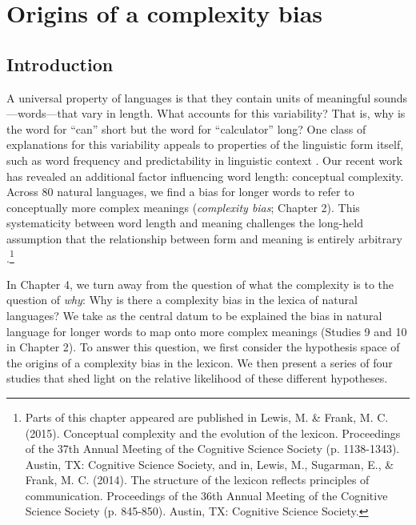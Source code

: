 
\chapter{Origins of a complexity bias}
\label{chapter:origins}

\section{Introduction}

A universal property of languages is that they contain units of meaningful sounds---words---that vary in length. What accounts for this variability? That is, why is the word for ``can'' short but the word for ``calculator'' long? One class of explanations for this variability appeals to properties of the linguistic form itself, such as word frequency \cite{zipf1936} and predictability in linguistic context \cite{piantadosi2011a,mahowald2013info}. Our recent work has revealed an additional factor influencing word length: conceptual complexity. Across 80 natural languages, we find a bias for longer words to refer to conceptually more complex meanings ({\it complexity bias}; Chapter 2). This systematicity between word length and meaning challenges the long-held assumption that the relationship between form and meaning is entirely arbitrary \cite{saussure}.\footnote{Parts of this chapter appeared are published in  Lewis, M. \& Frank, M. C. (2015). Conceptual complexity and the evolution of the lexicon. Proceedings of the 37th Annual Meeting of the Cognitive Science Society (p. 1138-1343). Austin, TX: Cognitive Science Society, and in,  Lewis, M., Sugarman, E., \& Frank, M. C. (2014). The structure of the lexicon reflects principles of communication. Proceedings of the 36th Annual Meeting of the Cognitive Science Society (p. 845-850). Austin, TX: Cognitive Science Society.}

In Chapter 4, we turn away from the question of what the complexity is to the question of {\it why}: Why is there a complexity bias in the lexica of natural languages? We take as the central datum to be explained the bias in natural language for longer words to map onto more complex meanings (Studies 9 and 10 in Chapter 2).  To answer this question, we first consider the hypothesis space of the origins of a complexity bias in the lexicon. We then present a series of four studies that shed light on the relative likelihood of these different hypotheses. 

